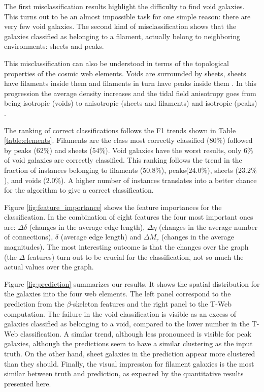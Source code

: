 \documentclass[usenatbib]{mnras}
\begin{document}
The first misclassification results highlight the difficulty to find
void galaxies.
This turns out to be an almost impossible task for one simple reason:
there are very few void galaxies.
The second kind of misclassification shows that the galaxies
classified as belonging to a filament, actually belong to neighboring
environments: sheets and peaks.

This misclassification can also be understood in terms of the
topological properties of the cosmic web elements. 
Voids are surrounded by sheets, sheets have filaments inside them and
filaments in turn have peaks inside them \citep{Cautun2014}. 
In this progression the average density increases and the tidal field
anisotropy goes from being isotropic (voids) to anisotropic (sheets
and filaments) and isotropic (peaks) \citep{2015MNRAS.453..497B}.

The ranking of correct classifications follows the F1 trends
shown in Table \ref{table:elements}.
Filaments are the class most correctly classified ($80\%$) followed by
peaks ($62\%$) and sheets ($54\%$).
Void galaxies have the worst results, only $6\%$ of void galaxies are
correctly classified.
This ranking follows the trend in the fraction of instances belonging to
filaments ($50.8\%$), peaks($24.0\%$), sheets ($23.2\%$), and voids ($2.0\%$).
A higher number of instances translates into a better chance for the
algorithm to give a correct classification. 


Figure \ref{fig:feature_importance} shows the feature
importances for the classification.
In the combination of eight features the four most important ones are:
$\Delta \delta$ (changes in the average edge length), $\Delta \eta$
(changes in the average number of connections), $\delta$ (average edge
length) and $\Delta M_r$ (changes in the average magnitudes).
The most interesting outcome is that the changes over the graph (the 
$\Delta$ features) turn out to be crucial for the classification, not
so much the actual values over the graph.

Figure  \ref{fig:prediction} summarizes our results. 
It shows the spatial distribution for the galaxies into the four web
elements. 
The left panel correspond to the prediction from the
$\beta$-skeleton features and the right panel to the T-Web
computation.
The failure in the void classification is visible as an excess of
galaxies classified as belonging to a void, compared to the lower
number in the T-Web classification.
A similar trend, although less pronounced is visible for peak
galaxies, although the predictions seem to have a similar clustering
as the input truth. 
On the other hand, sheet galaxies in the prediction appear more
clustered than they should.
Finally, the visual impression for filament galaxies is the most
similar between truth and prediction, as expected by the quantitative
results presented here.
\end{document}
